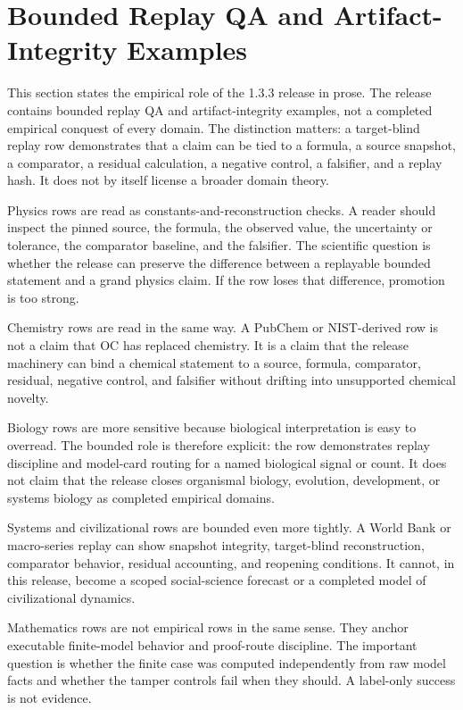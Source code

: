 \section{Bounded Replay QA and Artifact-Integrity Examples}
\label{sec:oc133-bounded-replay-qa-artifact-integrity-examples}
This section states the empirical role of the 1.3.3 release in prose. The release contains bounded replay QA and artifact-integrity examples, not a completed empirical conquest of every domain. The distinction matters: a target-blind replay row demonstrates that a claim can be tied to a formula, a source snapshot, a comparator, a residual calculation, a negative control, a falsifier, and a replay hash. It does not by itself license a broader domain theory.

Physics rows are read as constants-and-reconstruction checks. A reader should inspect the pinned source, the formula, the observed value, the uncertainty or tolerance, the comparator baseline, and the falsifier. The scientific question is whether the release can preserve the difference between a replayable bounded statement and a grand physics claim. If the row loses that difference, promotion is too strong.

Chemistry rows are read in the same way. A PubChem or NIST-derived row is not a claim that OC has replaced chemistry. It is a claim that the release machinery can bind a chemical statement to a source, formula, comparator, residual, negative control, and falsifier without drifting into unsupported chemical novelty.

Biology rows are more sensitive because biological interpretation is easy to overread. The bounded role is therefore explicit: the row demonstrates replay discipline and model-card routing for a named biological signal or count. It does not claim that the release closes organismal biology, evolution, development, or systems biology as completed empirical domains.

Systems and civilizational rows are bounded even more tightly. A World Bank or macro-series replay can show snapshot integrity, target-blind reconstruction, comparator behavior, residual accounting, and reopening conditions. It cannot, in this release, become a scoped social-science forecast or a completed model of civilizational dynamics.

Mathematics rows are not empirical rows in the same sense. They anchor executable finite-model behavior and proof-route discipline. The important question is whether the finite case was computed independently from raw model facts and whether the tamper controls fail when they should. A label-only success is not evidence.

